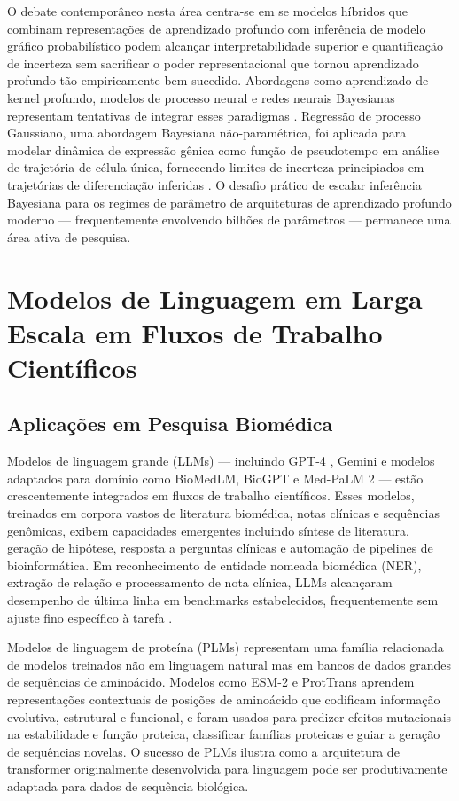 O debate contemporâneo nesta área centra-se em se modelos híbridos que combinam representações de aprendizado profundo com inferência de modelo gráfico probabilístico podem alcançar interpretabilidade superior e quantificação de incerteza sem sacrificar o poder representacional que tornou aprendizado profundo tão empiricamente bem-sucedido. Abordagens como aprendizado de kernel profundo, modelos de processo neural e redes neurais Bayesianas representam tentativas de integrar esses paradigmas \parencite{wilson2020}. Regressão de processo Gaussiano, uma abordagem Bayesiana não-paramétrica, foi aplicada para modelar dinâmica de expressão gênica como função de pseudotempo em análise de trajetória de célula única, fornecendo limites de incerteza principiados em trajetórias de diferenciação inferidas \parencite{lonnberg2017}. O desafio prático de escalar inferência Bayesiana para os regimes de parâmetro de arquiteturas de aprendizado profundo moderno --- frequentemente envolvendo bilhões de parâmetros --- permanece uma área ativa de pesquisa.

\section{Modelos de Linguagem em Larga Escala em Fluxos de Trabalho Científicos}

\subsection{Aplicações em Pesquisa Biomédica}

Modelos de linguagem grande (LLMs) --- incluindo GPT-4 \parencite{openai2023}, Gemini \parencite{googledeepming2023} e modelos adaptados para domínio como BioMedLM, BioGPT \parencite{luo2022} e Med-PaLM 2 \parencite{singhal2023} --- estão crescentemente integrados em fluxos de trabalho científicos. Esses modelos, treinados em corpora vastos de literatura biomédica, notas clínicas e sequências genômicas, exibem capacidades emergentes incluindo síntese de literatura, geração de hipótese, resposta a perguntas clínicas e automação de pipelines de bioinformática. Em reconhecimento de entidade nomeada biomédica (NER), extração de relação e processamento de nota clínica, LLMs alcançaram desempenho de última linha em benchmarks estabelecidos, frequentemente sem ajuste fino específico à tarefa \parencite{wei2022}.

Modelos de linguagem de proteína (PLMs) representam uma família relacionada de modelos treinados não em linguagem natural mas em bancos de dados grandes de sequências de aminoácido. Modelos como ESM-2 \parencite{lin2023} e ProtTrans \parencite{elnaggar2022} aprendem representações contextuais de posições de aminoácido que codificam informação evolutiva, estrutural e funcional, e foram usados para predizer efeitos mutacionais na estabilidade e função proteica, classificar famílias proteicas e guiar a geração de sequências novelas. O sucesso de PLMs ilustra como a arquitetura de transformer originalmente desenvolvida para linguagem pode ser produtivamente adaptada para dados de sequência biológica.

